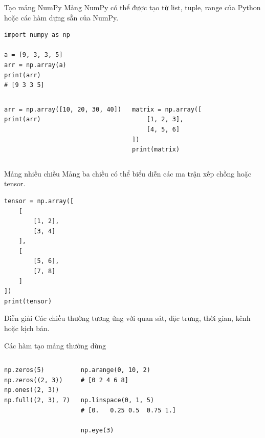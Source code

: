 \documentclass[aspectratio=169,11pt]{beamer}
\begin{document}
\begin{frame}[fragile]{Tạo mảng NumPy}
\small
Mảng NumPy có thể được tạo từ list, tuple, range của Python hoặc các hàm dựng sẵn của NumPy.
\begin{lstlisting}[style=py]
import numpy as np

a = [9, 3, 3, 5]
arr = np.array(a)
print(arr)
# [9 3 3 5]
\end{lstlisting}
\vspace{0.2em}
\begin{columns}[T]
\begin{lstlisting}[style=py]
arr = np.array([10, 20, 30, 40])
print(arr)
\end{lstlisting}
\begin{lstlisting}[style=py]
matrix = np.array([
    [1, 2, 3],
    [4, 5, 6]
])
print(matrix)
\end{lstlisting}
\end{columns}
\end{frame}

\begin{frame}[fragile]{Mảng nhiều chiều}
\small
Mảng ba chiều có thể biểu diễn các ma trận xếp chồng hoặc tensor.
\begin{lstlisting}[style=py]
tensor = np.array([
    [
        [1, 2],
        [3, 4]
    ],
    [
        [5, 6],
        [7, 8]
    ]
])
print(tensor)
\end{lstlisting}
\begin{block}{Diễn giải}
Các chiều thường tương ứng với quan sát, đặc trưng, thời gian, kênh hoặc kịch bản.
\end{block}
\end{frame}

\begin{frame}[fragile]{Các hàm tạo mảng thường dùng}
\small
\begin{columns}[T]
\begin{lstlisting}[style=py]
np.zeros(5)
np.zeros((2, 3))
np.ones((2, 3))
np.full((2, 3), 7)
\end{lstlisting}
\begin{lstlisting}[style=py]
np.arange(0, 10, 2)
# [0 2 4 6 8]

np.linspace(0, 1, 5)
# [0.   0.25 0.5  0.75 1.]

np.eye(3)
\end{lstlisting}
\end{columns}
\end{frame}
\end{document}
